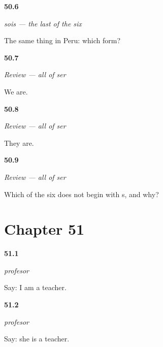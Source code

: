 \noindent\begin{minipage}[t]{\linewidth}
\raggedright
\hypertarget{review-ES-C09-sois-where}{\textbf{50.6}} \emph{sois — the last of the six}\par
\small The same thing in Peru: which form?
\end{minipage}\par\medskip

\noindent\begin{minipage}[t]{\linewidth}
\raggedright
\hypertarget{review-ES-C09-repaso-ser-we}{\textbf{50.7}} \emph{Review — all of ser}\par
\small We are.
\end{minipage}\par\medskip

\noindent\begin{minipage}[t]{\linewidth}
\raggedright
\hypertarget{review-ES-C09-repaso-ser-they}{\textbf{50.8}} \emph{Review — all of ser}\par
\small They are.
\end{minipage}\par\medskip

\noindent\begin{minipage}[t]{\linewidth}
\raggedright
\hypertarget{review-ES-C09-repaso-ser-odd}{\textbf{50.9}} \emph{Review — all of ser}\par
\small Which of the six does not begin with s, and why?
\end{minipage}\par\medskip

\section*{Chapter 51}

\noindent\begin{minipage}[t]{\linewidth}
\raggedright
\hypertarget{review-ES-C09-profesor-say}{\textbf{51.1}} \emph{profesor}\par
\small Say: I am a teacher.
\end{minipage}\par\medskip

\noindent\begin{minipage}[t]{\linewidth}
\raggedright
\hypertarget{review-ES-C09-profesor-she}{\textbf{51.2}} \emph{profesor}\par
\small Say: she is a teacher.
\end{minipage}\par\medskip

